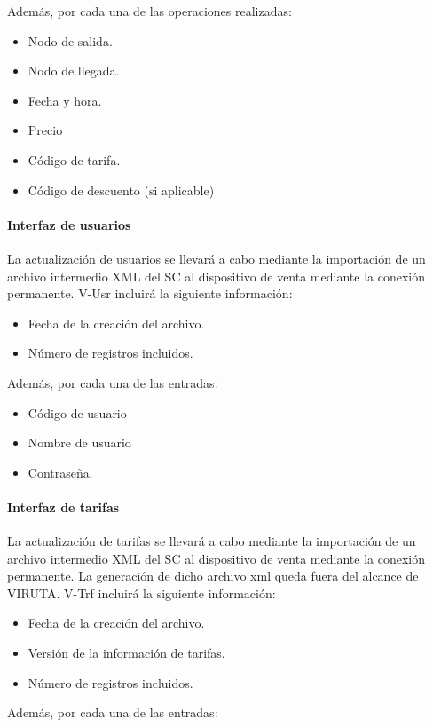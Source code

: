 Además, por cada una de las operaciones realizadas:

\begin{itemize}
\item Nodo de salida.
\item Nodo de llegada.
\item Fecha y hora.
\item Precio
\item Código de tarifa.
\item Código de descuento (si aplicable)
\end{itemize}

\paragraph{Interfaz de usuarios}

La actualización de usuarios se llevará a cabo mediante la importación de un archivo intermedio XML del SC al dispositivo de venta mediante la conexión permanente. V-Usr incluirá la siguiente información:

\begin{itemize}
\item Fecha de la creación del archivo.
\item Número de registros incluidos.
\end{itemize}

Además, por cada una de las entradas:

\begin{itemize}
\item Código de usuario
\item Nombre de usuario
\item Contraseña.
\end{itemize}

\paragraph{Interfaz de tarifas}
La actualización de tarifas se llevará a cabo mediante la importación de un archivo intermedio XML del SC al dispositivo de venta mediante la conexión permanente. La generación de dicho archivo xml queda fuera del alcance de VIRUTA. V-Trf incluirá la siguiente información:

\begin{itemize}
\item Fecha de la creación del archivo.
\item Versión de la información de tarifas.
\item Número de registros incluidos.

\end{itemize}
Además, por cada una de las entradas:

